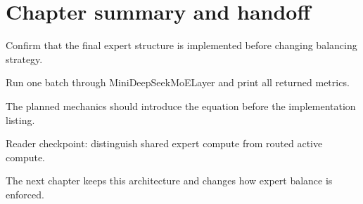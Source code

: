 \section{Chapter summary and handoff}
\label{sec:ch08-chapter-summary-and-handoff}

Confirm that the final expert structure is implemented before changing balancing strategy.



Run one batch through MiniDeepSeekMoELayer and print all returned metrics.



The planned mechanics should introduce the equation before the implementation listing.





\begin{checkpointbox}
Reader checkpoint: distinguish shared expert compute from routed active compute.
\end{checkpointbox}

The next chapter keeps this architecture and changes how expert balance is enforced.
